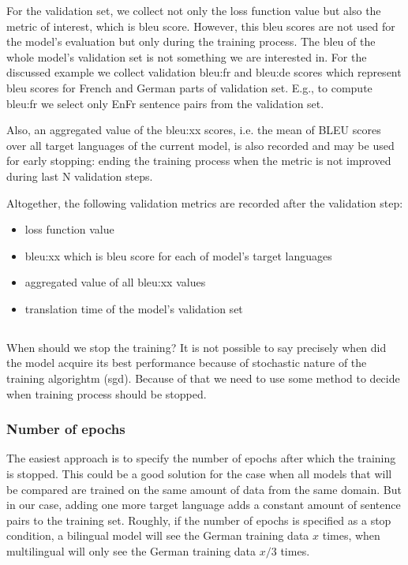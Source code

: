 For the validation set, we collect not only the loss function value
but also the metric of interest, which is \acrshort{bleu} score.
However, this \acrshort{bleu} scores are not used for the model's
evaluation but only during the training process.
The \acrshort{bleu} of the whole model's validation set
is not something we are interested in.
For the discussed example we collect validation bleu:fr and bleu:de scores
which represent \acrshort{bleu} scores for French and German
parts of validation set.
E.g., to compute bleu:fr we select only En\to{}Fr sentence pairs from the
validation set.

Also, an aggregated value of the bleu:xx scores, i.e. the mean of BLEU scores
over all target languages of the current model, is also recorded
and may be used for early stopping: ending the training process
when the metric is not improved during last N validation steps.

\begin{samepage}
Altogether, the following validation metrics are recorded after the
validation step:
\begin{itemize}
	\item loss function value
	\item bleu:xx which is \acrshort{bleu} score for each of
	model's target languages
	\item aggregated value of all bleu:xx values
	\item translation time of the model's validation set
\end{itemize}
\end{samepage}

\subsection{}
\label{section:finishing-the-training}

When should we stop the training?
It is not possible to say precisely when did the model
acquire its best performance because of stochastic nature of
the training algorightm (\acrshort{sgd}).
Because of that we need to use some method to decide when
training process should be stopped.


\subsubsection*{Number of \glspl{epoch}}

The easiest approach is to specify the number of \glspl{epoch}
after which the training is stopped.
This could be a good solution for the case when all models
that will be compared are trained on the same amount of data from
the same domain.
But in our case, adding one more target language adds a constant
amount of sentence pairs to the training set.
Roughly, if the number of \glspl{epoch} is specified as a stop
condition, a bilingual  model will see the German
training data $x$ times, when multilingual 
will only see the German training data $x / 3$ times.


